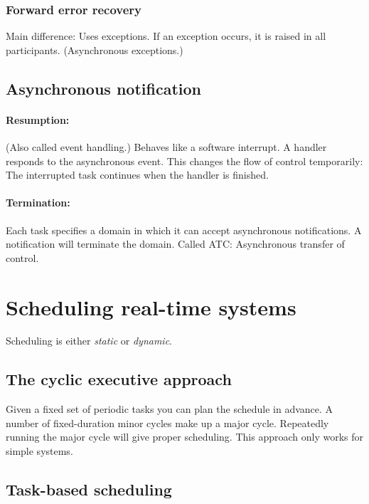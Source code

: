 \documentclass[a4paper, 12pt]{article}
\begin{document}
\subsubsection{Forward error recovery}
Main difference: Uses exceptions. If an exception occurs, it is raised in all participants. (Asynchronous exceptions.)

\subsection{Asynchronous notification}
\paragraph{Resumption:} (Also called event handling.) Behaves like a software interrupt. A handler responds to the asynchronous event. This changes the flow of control temporarily: The interrupted task continues when the handler is finished.
\paragraph{Termination:} Each task specifies a domain in which it can accept asynchronous notifications. A notification will terminate the domain. Called ATC: Asynchronous transfer of control.



\section{Scheduling real-time systems}
Scheduling is either \emph{static} or \emph{dynamic}.

\subsection{The cyclic executive approach}
Given a fixed set of periodic tasks you can plan the schedule in advance. A number of fixed-duration minor cycles make up a major cycle. Repeatedly running the major cycle will give proper scheduling. This approach only works for simple systems.

\subsection{Task-based scheduling}
\end{document}
